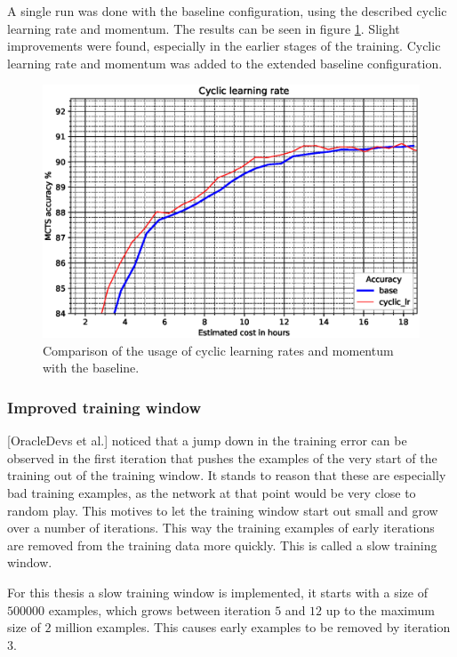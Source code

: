 \documentclass[12pt,onecolumn,oneside,titlepage]{article}
\begin{document}
A single run was done with the baseline configuration, using the described cyclic learning rate and momentum. The results can be seen in figure \ref{fig:cyclic_results}.
Slight improvements were found, especially in the earlier stages of the training. Cyclic learning rate and momentum was added to the extended baseline 
configuration. 


\begin{figure}[H]
\centering
\includegraphics[clip,width=\columnwidth]{cyclic_results}
\caption{Comparison of the usage of cyclic learning rates and momentum with the baseline.}
\label{fig:cyclic_results}
\end{figure}



\subsubsection{Improved training window}

\cite{oracledevs6}[OracleDevs et al.] noticed that a jump down in the training error can be observed in the first iteration that pushes the examples of the very start of the training out of the training window. It stands to 
reason that these are especially bad training examples, as the network at that point would be very close to random play. This motives to let the training window start out small and grow over a number of iterations. This way the 
training examples of early iterations are removed from the training data more quickly. This is called a slow training window.

For this thesis a slow training window is implemented, it starts with a size of $500000$ examples, which grows between iteration $5$ and $12$ up to the maximum size of $2$ million examples. This causes early examples to be removed by iteration $3$.
\end{document}

